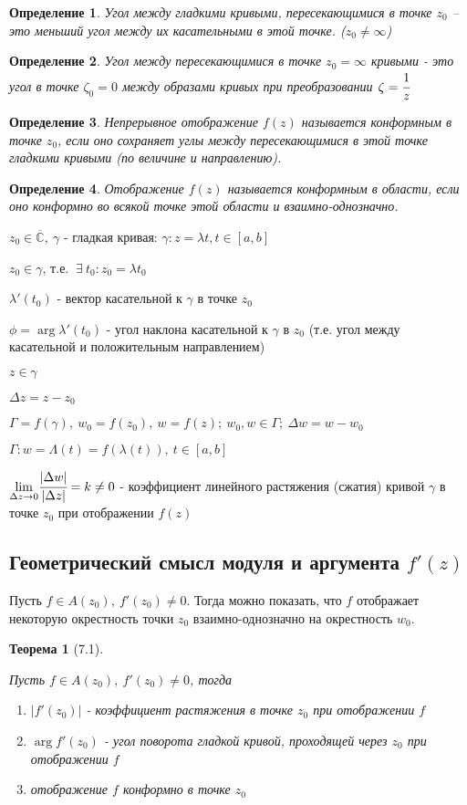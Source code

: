 \documentclass[draft]{report}
\newcommand{\forcenewline}{$\phantom{\mbox{newline}}$}
\renewcommand{\C}{\mathbb{C}}
\newcommand{\mlim}[1]{\underset{#1}{\lim}}
\renewcommand{\bar}{\overline}
\newcommand{\g}{\gamma}
\renewcommand{\f}{\phi}
\renewcommand{\l}{\lambda}
\newcommand{\D}{\Delta}
\newcommand{\E}{\ \exists}
\newcommand{\CC}{\bar{\C}}
\newcommand{\opr}[1]{\begin{opred}#1\end{opred}}
\newtheorem*{theor}{Теорема}
\newtheorem*{opred}{Определение}
\theoremstyle{remark}
\begin{document}
\opr{Угол между гладкими кривыми, пересекающимися в точке $z_0$ -- это меньший угол между их касательными в этой точке. ($z_0\neq\infty$)}

\opr{Угол между пересекающимися в точке $z_0=\infty$ кривыми - это угол в точке $\zeta_0=0$ между образами кривых при преобразовании $\zeta=\cfrac1z$}

\opr{Непрерывное отображение $f(z)$ называется конформным в точке $z_0$, если оно сохраняет углы между пересекающимися в этой точке гладкими кривыми (по величине и направлению).}

\opr{Отображение $f(z)$ называется конформным в области, если оно конформно во всякой точке этой области и взаимно-однозначно.}

$z_0\in\CC,\ \gamma$ - гладкая кривая: $\gamma\colon z=\lambda{t},t\in[a,b]$

$z_0\in\gamma$, т.е. $\E\ t_0\colon z_0=\lambda{t_0}$

$\lambda'(t_0)$ - вектор касательной к $\gamma$ в точке $z_0$

$\f=\arg \l'(t_0)$ - угол наклона касательной к $\g$ в $z_0$ (т.е. угол между касательной и положительным направлением)

$z\in\g$

$\D z=z-z_0$

$\Gamma=f(\gamma),\ w_0=f(z_0),\ w=f(z);\ w_0,w\in\Gamma;\ \D w=w-w_0$

$\Gamma\colon w=\Lambda(t)=f(\l(t)),\ t\in[a,b]$

$\mlim{\D z\to0}\cfrac{|\D w|}{|\D z|}=k\neq0$ - коэффициент линейного растяжения (сжатия) кривой $\g$ в точке $z_0$ при отображении $f(z)$

\subsection{Геометрический смысл модуля и аргумента $f'(z)$}

Пусть $f\in A(z_0),\ f'(z_0)\neq0$. Тогда можно показать, что $f$ отображает некоторую окрестность точки $z_0$ взаимно-однозначно на окрестность $w_0$.

\begin{theor}[7.1]
\forcenewline

Пусть $f\in A(z_0),\ f'(z_0)\neq0$, тогда
\begin{enumerate}
\item[а)] $|f'(z_0)|$ - коэффициент растяжения в точке $z_0$ при отображении $f$
\item[б)] $\arg f'(z_0)$ - угол поворота гладкой кривой, проходящей через $z_0$ при отображении $f$
\item[в)] отображение $f$ конформно в точке $z_0$
\end{enumerate}
\end{theor}
\end{document}
